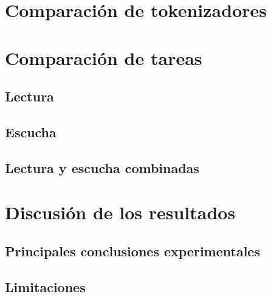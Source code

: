

\section{Comparación de tokenizadores}

\section{Comparación de tareas}
\subsection{Lectura}
\subsection{Escucha}
\subsection{Lectura y escucha combinadas}

\section{Discusión de los resultados}
\subsection{Principales conclusiones experimentales}
\subsection{Limitaciones}


